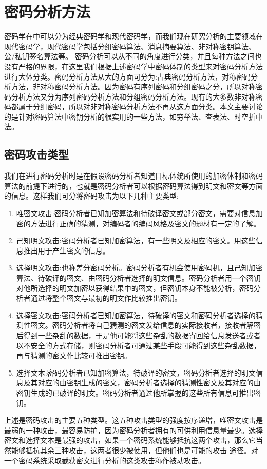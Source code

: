 \section{密码分析方法}
\label{sec:2.4}
密码学在\cite{feng02}中可以分为经典密码学和现代密码学，而我们现在研究分析的主要领域在现代密码学，现代密码学包括分组密码算法、消息摘要算法、非对称密钥算法、公/私钥签名算法等。
密码分析可以从不同的角度进行分类，并且每种方法之间也没有严格的界限，在这里我们根据上述密码学中密码体制的类型来对密码分析方法进行大体分类。密码分析方法从大的方面可分为:古典密码分析方法，对称密码分析方法，非对称密码分析方法。因为密码有序列密码和分组密码之分，所以对称密码分析方法又分为序列密码分析方法和分组密码分析方法。现有的大多数非对称密码都属于分组密码，所以对非对称密码分析方法不再从这方面分类。本文主要讨论的是针对密码算法中密钥分析的很实用的一些方法，如穷举法、查表法、时空折中法。
\subsection{密码攻击类型}
我们在进行密码分析时是在假设密码分析者知道目标体统所使用的加密体制和密码算法的前提下进行的，也就是密码分析者可以根据密码算法得到明文和密文等方面的信息。这样我们可分将密码攻击为以下几种主要类型:
\begin{enumerate}
\item 唯密文攻击:密码分析者已知加密算法和待破译密文或部分密文，需要对信息加密的方法进行正确的猜测，对编码者的编码风格及密文的题材有一定的了解。
\item 己知明文攻击:密码分析者已知加密算法，有一些明文及相应的密文。用这些信息推出用于产生密文的信息。
\item 选择明文攻击:也称差分密码分析。密码分析者有机会使用密码机，且己知加密算法、待破译的密文、由密码分析者选择的明文信息。密码分析者用一个密钥对他所选择的明文加密以获得结果中的密文，但密钥本身不能被分析，密码分析者通过将整个密文与最初的明文作比较推出密钥。
\item 选择密文攻击:密码分析者已知加密算法，待破译的密文和密码分析者选择的猜测性密文。密码分析者将自己猜测的密文发给信息的实际接收者，接收者解密后得到一些杂乱的数据，于是他可能将这些杂乱的数据寄回给信息发送者或者以不安全的方式存储，则密码分析者可通过某些手段可能得到这些杂乱数据，再与猜测的密文作比较可推出密钥。
\item 选择文本:密码分析者已知加密算法，待破译的密文，密码分析者选择的明文信息及其对应的由密钥生成的密文，密码分析者选择的猜测性密文及其对应的由密钥生成的已破译的明文。密码分析者通过他所掌握的这些所有信息可推出密钥。
\end{enumerate}
上述是密码攻击的主要五种类型。这五种攻击类型的强度按序递增，唯密文攻击是最弱的一种攻击，最容易防护，因为密码分析者拥有的可供利用信息量最少。选择密文和选择文本是最强的攻击，如果一个密码系统能够抵抗这两个攻击，那么它当然能够抵抗其余三种攻击，这两者很少被使用，但他们也是可能的攻击
途径。对一个密码系统采取截获密文进行分析的这类攻击称作被动攻击。

